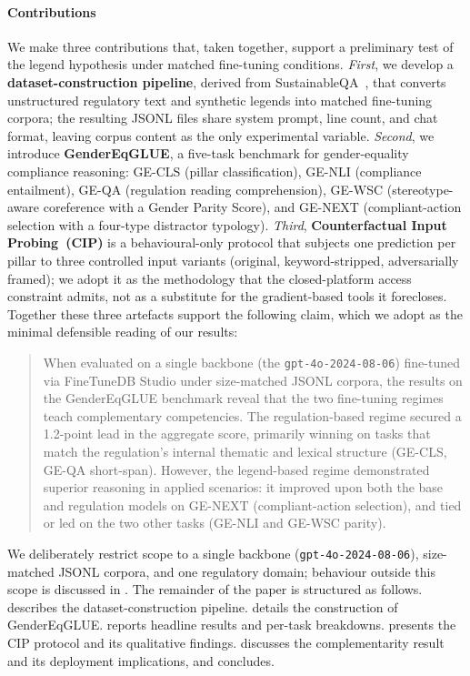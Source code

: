 \documentclass[pdflatex, sn-apa]{sn-jnl}%
\theoremstyle{thmstyleone}%
\theoremstyle{thmstyletwo}%
\theoremstyle{thmstylethree}%
\begin{document}
\paragraph{Contributions}
We make three contributions that, taken together, support a preliminary test of
the legend hypothesis under matched fine-tuning conditions. \emph{First}, we
develop a \textbf{dataset-construction pipeline}, derived from
SustainableQA~\citep{wattenberg2025sustainableqa}, that converts unstructured
regulatory text and synthetic legends into matched fine-tuning corpora; the
resulting JSONL files share system prompt, line count, and chat format, leaving
corpus content as the only experimental variable. \emph{Second}, we introduce
\textbf{GenderEqGLUE}, a five-task benchmark for gender-equality compliance
reasoning: GE-CLS (pillar classification), GE-NLI (compliance entailment),
GE-QA (regulation reading comprehension), GE-WSC (stereotype-aware coreference
with a Gender Parity Score), and GE-NEXT (compliant-action selection with a
four-type distractor typology). \emph{Third}, \textbf{Counterfactual Input
Probing~(CIP)} is a behavioural-only protocol that subjects one prediction per
pillar to three controlled input variants (original, keyword-stripped,
adversarially framed); we adopt it as the methodology that the closed-platform
access constraint admits, not as a substitute for the gradient-based tools it
forecloses.     
Together these three artefacts support the following claim, which we adopt as
the minimal defensible reading of our results:

\begin{quote}
When evaluated on a single backbone (the \texttt{gpt-4o-2024-08-06}) fine-tuned
via FineTuneDB Studio under size-matched JSONL corpora, the results on the
GenderEqGLUE benchmark reveal that the two fine-tuning regimes teach
complementary competencies. The regulation-based regime secured a 1.2-point lead
in the aggregate score, primarily winning on tasks that match the regulation's
internal thematic and lexical structure (GE-CLS, GE-QA short-span). However, the
legend-based regime demonstrated superior reasoning in applied scenarios: it
improved upon both the base and regulation models on GE-NEXT (compliant-action
selection), and tied or led on the two other tasks (GE-NLI and GE-WSC parity).
\end{quote}
 
We deliberately restrict scope to a single backbone
(\texttt{gpt-4o-2024-08-06}), size-matched JSONL corpora, and one regulatory
domain; behaviour outside this scope is discussed in . The
remainder of the paper is structured as follows.  describes the
dataset-construction pipeline.  details the construction of
GenderEqGLUE.  reports headline results and per-task
breakdowns.  presents the CIP protocol and its qualitative
findings.  discusses the complementarity result and its
deployment implications, and  concludes.
\end{document}
